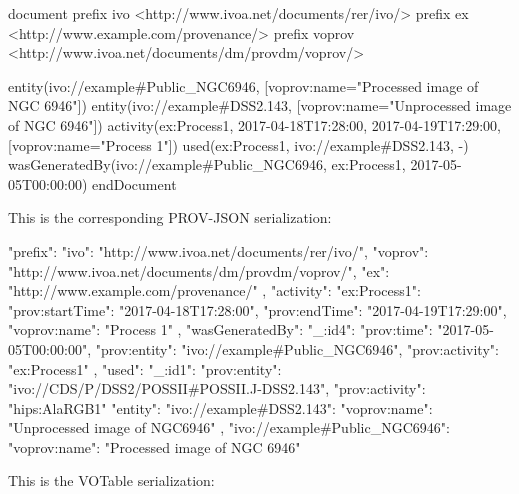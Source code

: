 \begin{verbnobox}[\scriptsize]

document
  prefix ivo <http://www.ivoa.net/documents/rer/ivo/>
  prefix ex <http://www.example.com/provenance/>
  prefix voprov <http://www.ivoa.net/documents/dm/provdm/voprov/>

  entity(ivo://example#Public_NGC6946, [voprov:name="Processed image of NGC 6946"])
  entity(ivo://example#DSS2.143, [voprov:name="Unprocessed image of NGC 6946"])
  activity(ex:Process1, 2017-04-18T17:28:00, 2017-04-19T17:29:00, [voprov:name="Process 1"])
  used(ex:Process1, ivo://example#DSS2.143, -)
  wasGeneratedBy(ivo://example#Public_NGC6946, ex:Process1, 2017-05-05T00:00:00)
endDocument

\end{verbnobox}

This is the corresponding PROV-JSON serialization:

\begin{verbnobox}[\scriptsize]
{
  "prefix": {
    "ivo": "http://www.ivoa.net/documents/rer/ivo/",
    "voprov": "http://www.ivoa.net/documents/dm/provdm/voprov/",
    "ex": "http://www.example.com/provenance/"
  },
  "activity": {
    "ex:Process1": {
      "prov:startTime": "2017-04-18T17:28:00",
      "prov:endTime": "2017-04-19T17:29:00",
      "voprov:name": "Process 1"
    }
  },
  "wasGeneratedBy": {
    "_:id4": {
      "prov:time": "2017-05-05T00:00:00",
      "prov:entity": "ivo://example#Public_NGC6946",
      "prov:activity": "ex:Process1"
    }
  },
  "used": {
    "_:id1": {
      "prov:entity": "ivo://CDS/P/DSS2/POSSII#POSSII.J-DSS2.143",
      "prov:activity": "hips:AlaRGB1"
    }
  }
  "entity": {
    "ivo://example#DSS2.143": {
      "voprov:name": "Unprocessed image of NGC6946"
    },
    "ivo://example#Public_NGC6946": {
      "voprov:name": "Processed image of NGC 6946"
    }
  }
}
\end{verbnobox}

This is the VOTable serialization:


